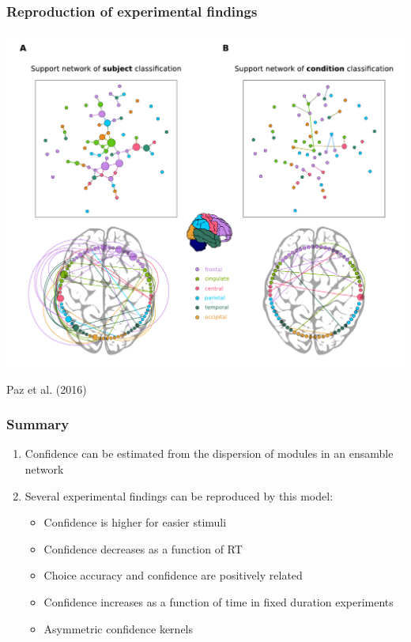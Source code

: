 \documentclass[final]{beamer}
\begin{document}
\begin{frame}
\frametitle{Reproduction of experimental findings}
\begin{center}
\includegraphics[width=0.9\columnwidth]{fig6}
\end{center}
\vspace{1cm}
\tiny{Paz et al. (2016)}
\end{frame}

\begin{frame}
\frametitle{Summary}
\begin{enumerate}
	\item Confidence can be estimated from the dispersion of modules in an ensamble network
	\item Several experimental findings can be reproduced by this model:
		\begin{itemize}
			\item Confidence is higher for easier stimuli
			\item Confidence decreases as a function of RT 
			\item Choice accuracy and confidence are positively related
			\item Confidence increases as a function of time in fixed duration experiments
			\item Asymmetric confidence kernels
		\end{itemize}
\end{enumerate}
\end{frame}

\end{document}
